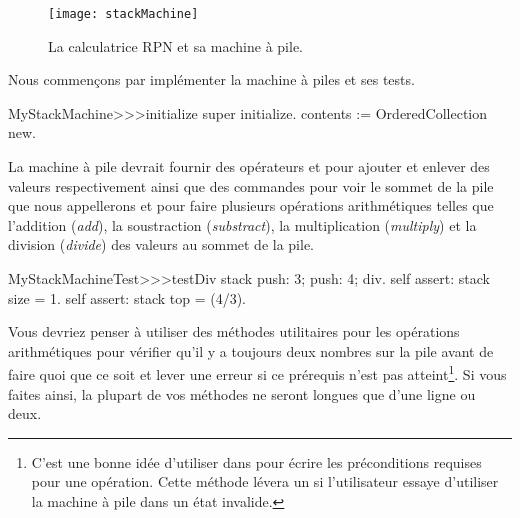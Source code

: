 \documentclass[a4paper,10pt,twoside]{book}
\begin{document}
\begin{figure}[ht]
\begin{center}
\texttt{[image: stackMachine]}
\caption{La calculatrice RPN et sa machine à pile.}
\end{center}
\end{figure}

Nous commençons par implémenter la machine à piles et ses tests.


\begin{code}{}
MyStackMachine>>>initialize
	super initialize.
	contents := OrderedCollection new.
\end{code}

La machine à pile devrait fournir des opérateurs  et
pour ajouter et enlever des valeurs respectivement ainsi que des
commandes pour
voir le sommet de la pile que nous appellerons  et pour faire
plusieurs opérations arithmétiques telles que l'addition (\emph{add}),
la soustraction (\emph{substract}), la multiplication
(\emph{multiply}) et la division (\emph{divide}) des valeurs au sommet
de la pile.


\begin{code}{}
MyStackMachineTest>>>testDiv
	stack
		push: 3;
		push: 4;
		div.
	self assert: stack size = 1.
	self assert: stack top = (4/3).
\end{code}

Vous devriez penser à utiliser des méthodes utilitaires pour les
opérations arithmétiques pour vérifier qu'il y a toujours deux nombres
sur la pile avant de faire quoi que ce soit et lever une erreur si
ce prérequis n'est pas atteint\footnote{C'est une bonne idée
  d'utiliser  
dans 
pour écrire les préconditions
  requises pour une opération. Cette méthode lévera un 
  si l'utilisateur essaye d'utiliser la machine à
 pile dans un état invalide.}.
Si vous faites ainsi, la plupart de vos méthodes ne seront longues que
d'une ligne ou deux.
\end{document}
